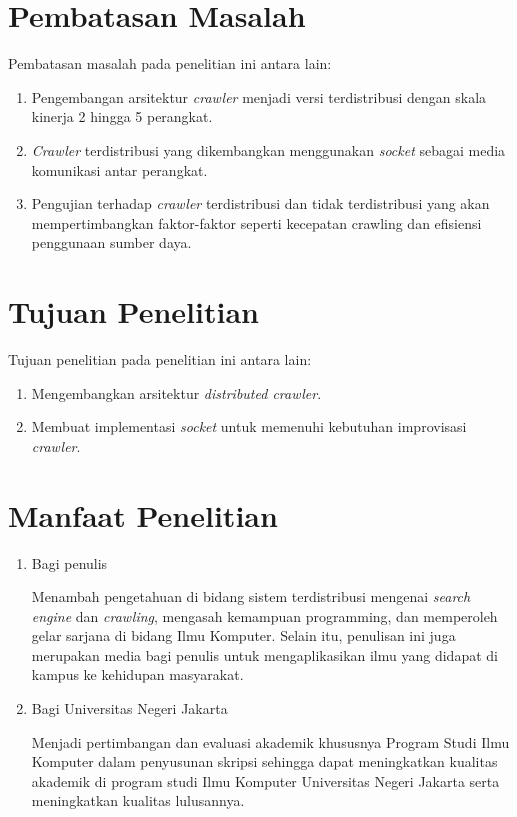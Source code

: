 \section{Pembatasan Masalah}
Pembatasan masalah pada penelitian ini antara lain:
\begin{enumerate}
	\item Pengembangan arsitektur \emph{crawler} menjadi versi terdistribusi dengan skala kinerja 2 hingga 5 perangkat.
	\item \emph{Crawler} terdistribusi yang dikembangkan menggunakan \emph{socket} sebagai media komunikasi antar perangkat.
	\item Pengujian terhadap \emph{crawler} terdistribusi dan tidak terdistribusi yang akan mempertimbangkan faktor-faktor seperti kecepatan crawling dan efisiensi penggunaan sumber daya.
\end{enumerate}

\section{Tujuan Penelitian}
Tujuan penelitian pada penelitian ini antara lain:
\begin{enumerate}
	\item Mengembangkan arsitektur \emph{distributed crawler}.
	\item Membuat implementasi \emph{socket} untuk memenuhi kebutuhan improvisasi \emph{crawler}.
\end{enumerate}

\section{Manfaat Penelitian}
\begin{enumerate}
	\item Bagi penulis
		
	Menambah pengetahuan di bidang sistem terdistribusi mengenai \emph{search engine} dan \emph{crawling}, mengasah kemampuan programming, dan memperoleh gelar sarjana di bidang Ilmu Komputer. Selain itu, penulisan ini juga merupakan media bagi penulis untuk mengaplikasikan ilmu yang didapat di kampus ke kehidupan masyarakat.
		
	\item Bagi Universitas Negeri Jakarta 
	 	
	Menjadi pertimbangan dan evaluasi akademik khususnya Program Studi Ilmu Komputer dalam penyusunan skripsi sehingga dapat meningkatkan kualitas akademik di program studi Ilmu Komputer Universitas Negeri Jakarta serta meningkatkan kualitas lulusannya.
	 			
\end{enumerate}

